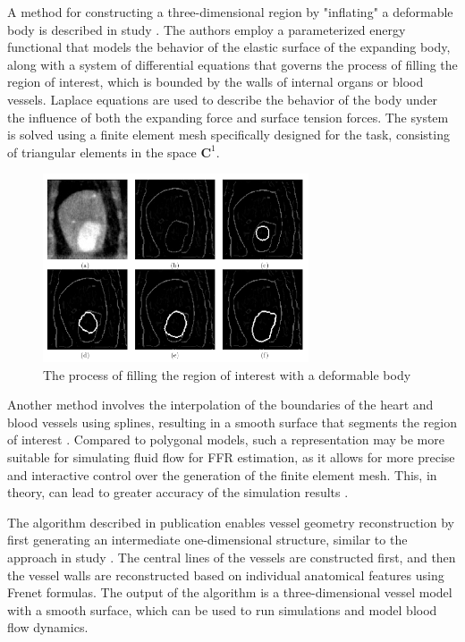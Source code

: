 \documentclass[default]{subfiles}
\begin{document}
A method for constructing a three-dimensional region by "inflating" a deformable body is described in study
\cite{mcinerney1995fem}. The authors employ a parameterized energy functional that models the behavior of the elastic
surface of the expanding body, along with a system of differential equations that governs the process of filling the
region of interest, which is bounded by the walls of internal organs or blood vessels. Laplace equations are used to
describe the behavior of the body under the influence of both the expanding force and surface tension forces. The
system is solved using a finite element mesh specifically designed for the task, consisting of triangular elements in
the space $\mathbf{C}^1$.

\begin{figure}[H]
    \centering
    \includegraphics[width=0.7\textwidth]{image/pic1.png}
    \caption{The process of filling the region of interest with a deformable body \cite{ mcinerney1995fem, mcinerney2002deformable, mcinerney1996deformable, terzopoulos1997deformable, mcinerney1999topology}}
\end{figure}

Another method involves the interpolation of the boundaries of the heart and blood vessels using splines, resulting in
a smooth surface that segments the region of interest \cite{ecabert2008automatic}. Compared to polygonal models, such a
representation may be more suitable for simulating fluid flow for FFR estimation, as it allows for more precise and
interactive control over the generation of the finite element mesh. This, in theory, can lead to greater accuracy of
the simulation results \cite{morris_2013, fluids_2019, marcinno_2025}.

The algorithm described in publication \cite{lu2020vessels} enables vessel geometry reconstruction by first generating
an intermediate one-dimensional structure, similar to the approach in study \cite{carson2019benchmark}. The central
lines of the vessels are constructed first, and then the vessel walls are reconstructed based on individual anatomical
features using Frenet formulas. The output of the algorithm is a three-dimensional vessel model with a smooth surface,
which can be used to run simulations and model blood flow dynamics.
\end{document}
